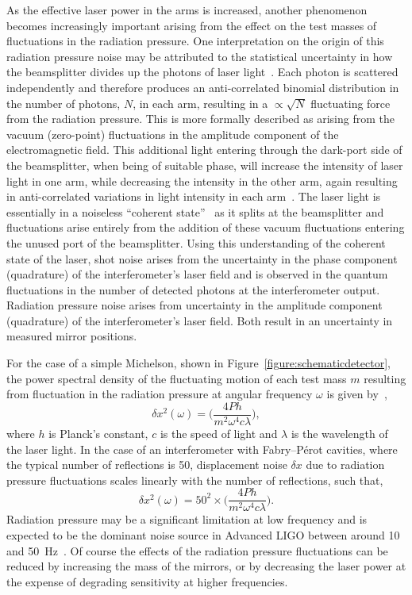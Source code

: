 \documentclass{article}
\begin{document}
As the effective laser power in the arms is increased, another phenomenon
becomes increasingly important arising from the effect on the test masses of
fluctuations in the radiation pressure. One interpretation on the origin of this
radiation pressure noise may be attributed to the statistical uncertainty in how
the beamsplitter divides up the photons of laser light~\cite{Edelstein}. Each
photon is scattered independently and therefore produces an anti-correlated
binomial distribution in the number of photons, $N$, in each arm, resulting in a
$\propto\sqrt{N}$ fluctuating force from the radiation pressure. This is more
formally described as arising from the vacuum (zero-point) fluctuations in the
amplitude component of the electromagnetic field. This additional light entering
through the dark-port side of the beamsplitter, when being of suitable phase,
will increase the intensity of laser light in one arm, while decreasing the
intensity in the other arm, again resulting in anti-correlated variations in
light intensity in each arm~\cite{Caves1, Caves2}. The laser light is
essentially in a noiseless ``coherent state''~\cite{Glauber:1963} as it splits
at the beamsplitter and fluctuations arise entirely from the addition
of these vacuum fluctuations entering the unused port of the beamsplitter. Using
this understanding of the coherent state of the laser, shot noise arises from
the uncertainty in the phase component (quadrature) of the interferometer's
laser field and is observed in the quantum fluctuations in the number of
detected photons at the interferometer output. Radiation pressure noise arises
from uncertainty in the amplitude component (quadrature) of the interferometer's
laser field. Both result in an uncertainty in measured mirror positions.

For the case of a simple Michelson, shown in
Figure~\ref{figure:schematicdetector}, the power spectral density of the
fluctuating motion of each test mass $m$ resulting from fluctuation in the
radiation pressure at angular frequency $\omega$ is given
by~\cite{Edelstein},
%
\begin{equation}
\delta x^2(\omega) = \biggl(\frac{4 P h}{m^2 \omega^4 c
\lambda}\biggr),
 \label{equ:radiation-pressure1}
\end{equation}
%
where $h$ is Planck's constant, $c$ is the speed of light and $\lambda$ is the
wavelength of the laser light. In the case of an interferometer with Fabry--P\'{e}rot
cavities, where the typical number of reflections is 50, displacement noise
$\delta x$ due to radiation pressure fluctuations scales linearly with the
number of reflections, such that,
%
\begin{equation}
\delta x^2(\omega) = 50^2 \times \biggl(\frac{4 P h}{m^2 \omega^4
c \lambda}\biggr).
 \label{equ:radiation-pressure2}
\end{equation}
%
Radiation pressure may be a significant limitation at low frequency and is
expected to be the dominant noise source in Advanced LIGO between around 10 and
50~Hz~\cite{Harry:2010}. Of course the effects of the radiation pressure
fluctuations can be reduced by increasing the mass of the mirrors, or by
decreasing the laser power at the expense of degrading sensitivity at higher
frequencies.
\end{document}
